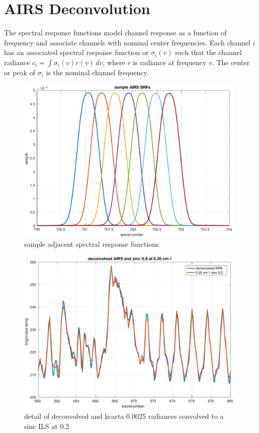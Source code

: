 \documentclass[12pt]{article}
\begin{document}
\FloatBarrier
\section{AIRS Deconvolution}
\label{decon}

The {\airs} spectral response functions model channel response as a
function of frequency and associate channels with nominal center
frequencies.  Each {\airs} channel $i$ has an associated spectral
response function or {\srf} $\sigma_i(v)$ such that the channel
radiance $c_i = \int \sigma_i(v)r(v)\,dv$, where $r$ is radiance at
frequency $v$.  The center or peak of $\sigma_i$ is the nominal
channel frequency.

\begin{figure} %
  \centering
  \includegraphics[height=8cm]{figures/airs_sample_SRFs.pdf}
  \caption{sample adjacent {\airs} spectral response functions}
  \label{srfs1}
\end{figure}

\begin{figure} %
  \centering
  \includegraphics[height=8cm]{figures/airs_decon_res.pdf}
  \caption{detail of deconvolved {\airs} and kcarta 0.0025 {\wn}
    radiances convolved to a sinc ILS at 0.2 {\wn}}
  \label{dsinc}
\end{figure}
\end{document}
